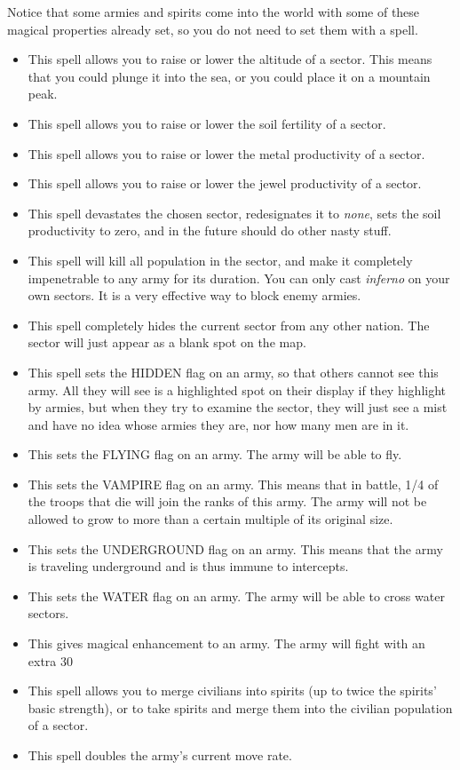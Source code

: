 Notice that some armies and spirits come into the world with some of
these magical properties already set, so you do not need to set them
with a spell.

\begin{itemize}
\item {}
This spell allows you to raise or lower the altitude of a sector.
This means that you could plunge it into the sea, or you could place
it on a mountain peak.
\item {}
This spell allows you to raise or lower the soil fertility of a
sector.
\item {}
This spell allows you to raise or lower the metal productivity of a
sector.
\item {}
This spell allows you to raise or lower the jewel productivity of a
sector.
\item {}
This spell devastates the chosen sector, redesignates it to
\emph{none}, sets the soil productivity to zero, and in the future
should do other nasty stuff.
\item {}
This spell will kill all population in the sector, and make it
completely impenetrable to any army for its duration.  You can only
cast \emph{inferno} on your own sectors.  It is a very effective
way to block enemy armies.
\item {}
This spell completely hides the current sector from any other nation.
The sector will just appear as a blank spot on the map.
\item {}
This spell sets the HIDDEN flag on an army, so that others cannot see
this army.
\comment  All they will see is a highlighted spot on their display
\comment if they highlight by armies, but when they try to examine the sector,
\comment they will just see a mist and have no idea whose armies they are, nor
\comment how many men are in it.
\item {}
This sets the FLYING flag on an army.  The army will be able to fly.
\item {}
This sets the VAMPIRE flag on an army.  This means that in battle, 1/4
of the troops that die will join the ranks of this army.  The army
will not be allowed to grow to more than a certain multiple of its
original size.
\item {}
This sets the UNDERGROUND flag on an army.  This means that the army is 
traveling underground and is thus immune to intercepts.
\item {}
This sets the WATER flag on an army.  The army will be able to cross
water sectors.
\item {}
This gives magical enhancement to an army.  The army will fight with an
extra 30%
\item {}
This spell allows you to merge civilians into spirits (up to twice the
spirits' basic strength), or to take spirits and merge them into the
civilian population of a sector.
\item {}
This spell doubles the army's current move rate.
\end{itemize}

